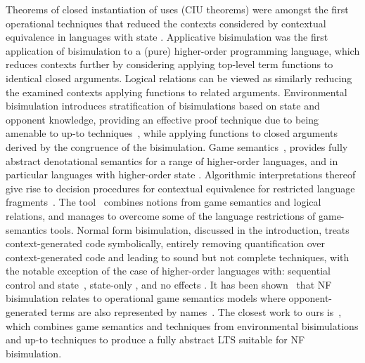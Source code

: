 Theorems of closed instantiation of uses (CIU theorems) were amongst the first operational techniques that reduced the contexts considered by contextual equivalence in languages with state \cite{mason_talcott_1991,felleisen1987calculi,gordon_hankin_lassen_1999}.
Applicative bisimulation \cite{applicative90} was the first application of bisimulation to a (pure) higher-order programming language, which reduces contexts further by considering applying top-level term functions to identical closed arguments.
Logical relations \cite{JaberTabareau15,state-dependent,HurDNV12} can be viewed as similarly reducing the examined contexts applying functions to related arguments.
Environmental bisimulation \cite{SumiiPierce07a,SumiiPierce07b,KoutavasW06,environmental} introduces stratification of bisimulations based on state and opponent knowledge, providing an effective proof technique due to being amenable to up-to techniques~\cite{BiernackiLP19,KoutavasW06,environmental,PousS11}, while applying functions to closed arguments derived by the congruence of the bisimulation.
%
Game semantics~\cite{AJM,HO,Nickau}, provides fully abstract denotational semantics for a range of higher-order languages, and in particular languages with higher-order state \cite{AbramskyHM98,Laird07,MurawskiT21}. Algorithmic interpretations thereof give rise to decision procedures for contextual equivalence for restricted language fragments~\cite{GhicaM03,hector,Dimovski14,coneqct}.
%
The  tool~\cite{syteci} combines notions from game semantics and logical relations, and manages to overcome some of the language restrictions of game-semantics tools.
%
Normal form bisimulation, discussed in the introduction, treats context-generated code symbolically, entirely removing quantification over context-generated code and leading to sound but not complete techniques, with the notable exception of the case of higher-order languages with: sequential control and state~\cite{StorvingLassenPOPL07}, state-only \cite{BiernackiLP19,KoutavasLT22}, and no effects \cite{KoutavasLT23}.
It has been shown~\cite{LassenL07,LassenLevy:nfbisimpoly,KoutavasLT22} that NF bisimulation relates to operational game semantics models where opponent-generated terms are also represented by names~\cite{Laird07,TzeGhica,Jaber15}.
The closest work to ours is~\cite{KoutavasLT22}, which combines game semantics and techniques from environmental bisimulations and up-to techniques to produce a fully abstract LTS suitable for NF bisimulation.

